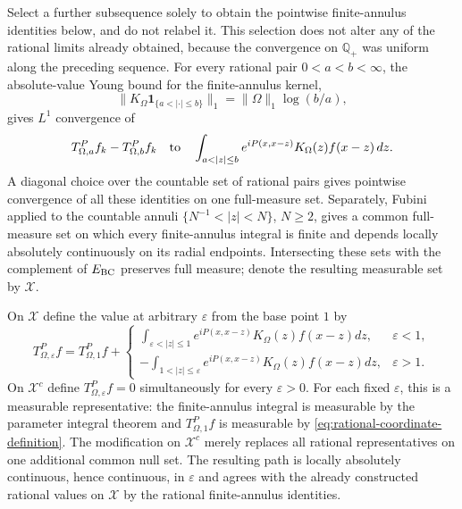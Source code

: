 \documentclass[11pt]{article}
\numberwithin{equation}{section}
\theoremstyle{remark}
\theoremstyle{definition}
\begin{document}
Select a further subsequence solely to obtain the pointwise finite-annulus
identities below, and do not relabel it.  This selection does not alter any
of the rational limits already obtained, because the convergence on
$\mathbb Q_+$ was uniform along the preceding sequence.
For every rational pair $0<a<b<\infty$, the absolute-value Young bound for
the finite-annulus kernel,
\[
 \|K_\Omega\mathbf1_{\{a<|\cdot|\le b\}}\|_1
 =\|\Omega\|_1\log(b/a),
\]
gives $L^1$ convergence of
\[
 T^P_{\Omega,a}f_k-T^P_{\Omega,b}f_k
 \quad\hbox{to}\quad
 \int_{a<|z|\le b}e^{iP(x,x-z)}K_\Omega(z)f(x-z)\,dz.
\]
A diagonal choice over the countable set of rational pairs gives pointwise
convergence of all these identities on one full-measure set.  Separately,
Fubini applied to the countable annuli
$\{N^{-1}<|z|<N\}$, $N\ge2$, gives a common full-measure set on which every
finite-annulus integral is finite and depends locally absolutely
continuously on its radial endpoints.  Intersecting these sets with the
complement of \(E_{\rm BC}\) preserves full measure; denote the resulting
measurable set by \(\mathcal X\).

On \(\mathcal X\) define the value at arbitrary $\varepsilon$ from the
base point $1$ by
\[
 T^P_{\Omega,\varepsilon}f=T^P_{\Omega,1}f+
 \begin{cases}
 \displaystyle\int_{\varepsilon<|z|\le1}e^{iP(x,x-z)}K_\Omega(z)f(x-z)dz,
 &\varepsilon<1,\\[1ex]
 \displaystyle-\int_{1<|z|\le\varepsilon}e^{iP(x,x-z)}K_\Omega(z)f(x-z)dz,
 &\varepsilon>1.
 \end{cases}
\]
On \(\mathcal X^c\) define \(T^P_{\Omega,\varepsilon}f=0\) simultaneously
for every \(\varepsilon>0\).  For each fixed \(\varepsilon\), this is a
measurable representative: the finite-annulus integral is measurable by
the parameter integral theorem and \(T^P_{\Omega,1}f\) is measurable by
\eqref{eq:rational-coordinate-definition}.  The modification on
\(\mathcal X^c\) merely replaces all rational representatives on one
additional common null set.
The resulting path is locally absolutely continuous, hence continuous,
in $\varepsilon$ and agrees with the already constructed rational values
on \(\mathcal X\) by the rational finite-annulus identities.
\end{document}
